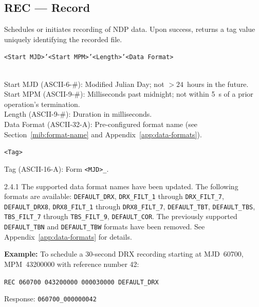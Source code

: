 \subsection{REC --- Record}
\label{cmd:rec}
\begin{description}[style=nextline]
    \item[Description:]
        Schedules or initiates recording of NDP data.  Upon success, returns a
        tag value uniquely identifying the recorded file.

    \item[Argument Format:]
        \texttt{<Start MJD>'<Start MPM>'<Length>'<Data Format>}

    \item[Arguments:]~\\
        Start MJD (ASCII-6-\#): Modified Julian Day; not $>24$~hours in the future. \\
        Start MPM (ASCII-9-\#): Milliseconds past midnight; not within 5~s of
            a prior operation's termination. \\
        Length (ASCII-9-\#): Duration in milliseconds. \\
        Data Format (ASCII-32-A): Pre-configured format name (see
            Section~\ref{mib:format-name} and Appendix~\ref{app:data-formats}).

    \item[Response Format:] \texttt{<Tag>}
    \item[Response Element:]
        Tag (ASCII-16-A): Form \texttt{<MJD>\_<Reference Number>}.
\end{description}

\begin{newInVersion}{2.4.1}
The supported data format names have been updated.  The following formats are
available:
\texttt{DEFAULT\_DRX},
\texttt{DRX\_FILT\_1} through \texttt{DRX\_FILT\_7},
\texttt{DEFAULT\_DRX8},
\texttt{DRX8\_FILT\_1} through \texttt{DRX8\_FILT\_7},
\texttt{DEFAULT\_TBT},
\texttt{DEFAULT\_TBS},
\texttt{TBS\_FILT\_7} through \texttt{TBS\_FILT\_9},
\texttt{DEFAULT\_COR}.
The previously supported \texttt{DEFAULT\_TBN} and \texttt{DEFAULT\_TBW} formats
have been removed.  See Appendix~\ref{app:data-formats} for details.
\end{newInVersion}

\begin{noteBox}
\textbf{Example:} To schedule a 30-second DRX recording starting at MJD~60700,
MPM~43200000 with reference number 42:

\texttt{REC 060700 043200000 000030000 DEFAULT\_DRX}

Response: \texttt{060700\_000000042}
\end{noteBox}

